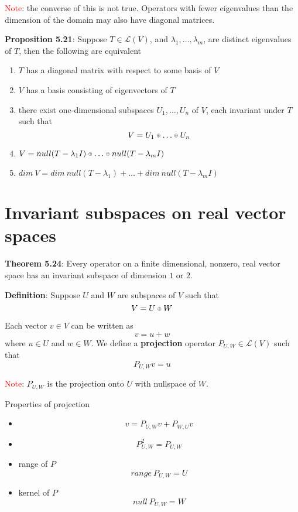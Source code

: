 \documentclass[a4paper, 10pt]{report}
\newcommand\smallmath[2]{#1{\raisebox{\dimexpr \fontdimen 22 \textfont 2
      - \fontdimen 22 \scriptscriptfont 2 \relax}{$\scriptscriptstyle #2$}}}
\newcommand\smalloplus{\smallmath\mathbin\oplus}
\begin{document}
\textcolor{red}{Note}: the converse of this is not true. Operators with fewer eigenvalues than the dimension of the domain may also have diagonal matrices. 

\begin{framed}
   \textbf{Proposition 5.21}: Suppose $T \in \mathcal{L}(V)$, and  $\lambda_1, \hdots, \lambda_{m}$,  are distinct eigenvalues of $T$, then the following are equivalent
   \begin{enumerate}
      \item $T$ has a diagonal matrix with respect to some basis of $V$
      \item $V$ has a basis consisting of eigenvectors of $T$
      \item there exist one-dimensional subspaces  $U_1, \hdots, U_n$ of $V$, each invariant under $T$ such that
         \[
           V = U_1 \smalloplus \hdots \smalloplus U_n
         \] 
      \item $V = null(T - \lambda_1 I) \smalloplus \hdots \smalloplus null (T - \lambda_m I)$
      \item $dim\ V = dim\ null(T - \lambda_1) + \hdots + dim\ null (T - \lambda_m I)$
   \end{enumerate}
\end{framed}

\section{Invariant subspaces on real vector spaces}

\begin{framed}
   \textbf{Theorem 5.24}: Every operator on a finite dimensional, nonzero, real vector space has an invariant subspace of dimension $1$ or $2$. 
\end{framed}

\begin{framed}
   \textbf{Definition}: Suppose $U$ and $W$ are subspaces of $V$ such that 
      \[
        V = U \smalloplus W
      \] 

      Each vector $v \in V$ can be written as 
      \[
        v = u + w
      \] 
      where $u \in U$ and $w \in W$. We define a \textbf{projection} operator $P_{U, W} \in \mathcal{L}(V)$ such that
      \[
         P_{U, W} v = u
      \] 
\end{framed}

\textcolor{red}{Note}: $P_{U, W} $ is the projection onto $U$ with nullspace of $W$. 

Properties of projection
\begin{itemize}
   \item
      \[
         v = P_{U, W} v + P_{W, U} v
      \] 
   \item 
      \[
         P_{U, W}^2 = P_{U, W}
      \] 
   \item range of $P$ 
      \[
         range\ P_{U, W} = U
      \] 
   \item kernel of $P$ 
      \[
         null\ P_{U, W} = W
      \] 
\end{itemize}
\end{document}

